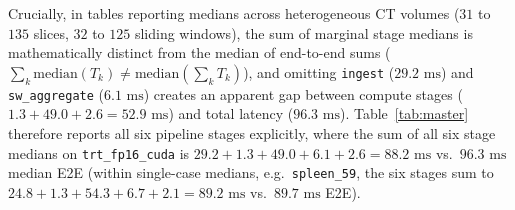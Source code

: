 \documentclass[10pt,twocolumn]{article}
\begin{document}
Crucially, in tables reporting medians across heterogeneous CT volumes ($31$ to $135$ slices, $32$ to $125$ sliding windows), the sum of marginal stage medians is mathematically distinct from the median of end-to-end sums ($\sum_k \text{median}(T_k) \neq \text{median}(\sum_k T_k)$), and omitting \texttt{ingest} ($29.2\text{ ms}$) and \texttt{sw\_aggregate} ($6.1\text{ ms}$) creates an apparent gap between compute stages ($1.3 + 49.0 + 2.6 = 52.9\text{ ms}$) and total latency ($96.3\text{ ms}$). Table~\ref{tab:master} therefore reports all six pipeline stages explicitly, where the sum of all six stage medians on \texttt{trt\_fp16\_cuda} is $29.2 + 1.3 + 49.0 + 6.1 + 2.6 = 88.2\text{ ms}$ vs.\ $96.3\text{ ms}$ median E2E (within single-case medians, e.g.\ \texttt{spleen\_59}, the six stages sum to $24.8 + 1.3 + 54.3 + 6.7 + 2.1 = 89.2\text{ ms}$ vs.\ $89.7\text{ ms}$ E2E).
\end{document}
